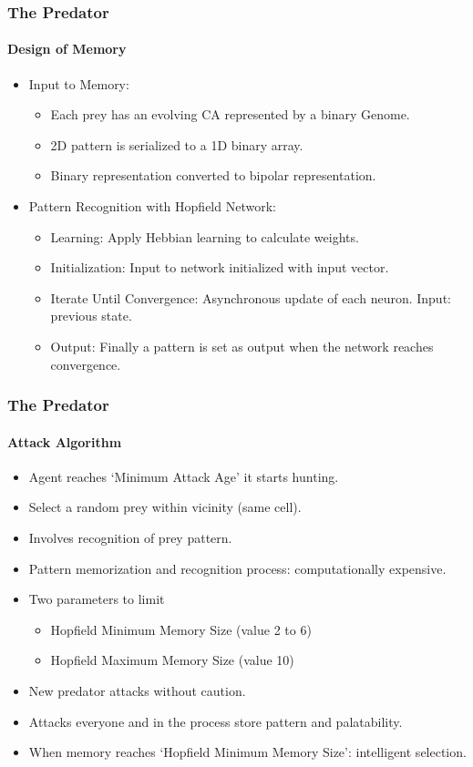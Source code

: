 \frame
{
	\frametitle{The Predator}
	\framesubtitle{Design of Memory}
	
	\begin{itemize}
		\item Input to Memory:
			\begin{itemize}
				\item Each prey has an evolving CA represented by a binary Genome.
				\item 2D pattern is serialized to a 1D binary array.
				\item Binary representation converted to bipolar representation.
			\end{itemize}
		\item Pattern Recognition with Hopfield Network:
			\begin{itemize}
				\item Learning: Apply Hebbian learning to calculate weights.
				\item Initialization: Input to network initialized with input vector.
				\item Iterate Until Convergence: Asynchronous update of each neuron. Input: previous state.
				\item Output: Finally a pattern is set as output when the network reaches convergence.
			\end{itemize}
	\end{itemize}
}

\frame
{
	\frametitle{The Predator}
	\framesubtitle{Attack Algorithm}
	
	\begin{itemize}
		\item Agent reaches `Minimum Attack Age' it starts hunting.
		\item Select a random prey within vicinity (same cell).
		\item Involves recognition of prey pattern.
		\item Pattern memorization and recognition process: computationally expensive.
		\item Two parameters to limit 
			\begin{itemize}
				\item Hopfield Minimum Memory Size (value 2 to 6)
				\item Hopfield Maximum Memory Size (value 10)
			\end{itemize}
		\item New predator attacks without caution. 
		\item Attacks everyone and in the process store pattern and palatability.
		\item When memory reaches `Hopfield Minimum Memory Size': intelligent selection.
	\end{itemize}
}
